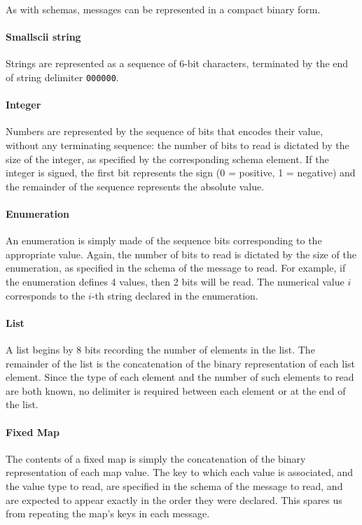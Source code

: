 As with schemas, messages can be represented in a compact binary form.

\paragraph{Smallscii string} Strings are represented as a sequence of 6-bit characters, terminated by the end of string delimiter \verb+000000+.

\paragraph{Integer} Numbers are represented by the sequence of bits that encodes their value, without any terminating sequence: the number of bits to read is dictated by the size of the integer, as specified by the corresponding schema element. If the integer is signed, the first bit represents the sign (0 = positive, 1 = negative) and the remainder of the sequence represents the absolute value. %

\paragraph{Enumeration} An enumeration is simply made of the sequence bits corresponding to the appropriate value. Again, the number of bits to read is dictated by the size of the enumeration, as specified in the schema of the message to read. For example, if the enumeration defines 4 values, then 2 bits will be read. The numerical value $i$ corresponds to the $i$-th string declared in the enumeration.

\paragraph{List} A list begins by 8 bits recording the number of elements in the list. The remainder of the list is the concatenation of the binary representation of each list element. Since the type of each element and the number of such elements to read are both known, no delimiter is required between each element or at the end of the list.

\paragraph{Fixed Map} The contents of a fixed map is simply the concatenation of the binary representation of each map value. The key to which each value is associated, and the value type to read, are specified in the schema of the message to read, and are expected to appear exactly in the order they were declared. This spares us from repeating the map's keys in each message.

